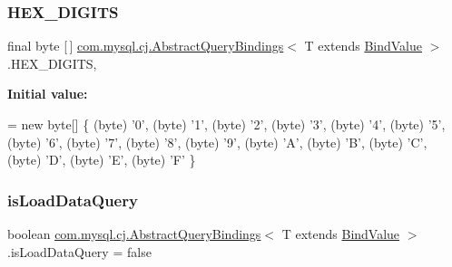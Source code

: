\subsubsection{\texorpdfstring{H\+E\+X\+\_\+\+D\+I\+G\+I\+TS}{HEX\_DIGITS}}
{\footnotesize\ttfamily final byte \mbox{[}$\,$\mbox{]} \mbox{\hyperlink{classcom_1_1mysql_1_1cj_1_1_abstract_query_bindings}{com.\+mysql.\+cj.\+Abstract\+Query\+Bindings}}$<$ T extends \mbox{\hyperlink{interfacecom_1_1mysql_1_1cj_1_1_bind_value}{Bind\+Value}} $>$.H\+E\+X\+\_\+\+D\+I\+G\+I\+TS\hspace{0.3cm}{\ttfamily [static]}, {\ttfamily [protected]}}

{\bfseries Initial value\+:}
\begin{DoxyCode}
= \textcolor{keyword}{new} byte[] \{ (byte) \textcolor{charliteral}{'0'}, (byte) \textcolor{charliteral}{'1'}, (byte) \textcolor{charliteral}{'2'}, (byte) \textcolor{charliteral}{'3'}, (byte) \textcolor{charliteral}{'4'}, (byte) \textcolor{charliteral}{'5'}, (byte) \textcolor{charliteral}{'6'}, (byte) \textcolor{charliteral}{
      '7'},
            (byte) \textcolor{charliteral}{'8'}, (byte) \textcolor{charliteral}{'9'}, (byte) \textcolor{charliteral}{'A'}, (byte) \textcolor{charliteral}{'B'}, (byte) \textcolor{charliteral}{'C'}, (byte) \textcolor{charliteral}{'D'}, (byte) \textcolor{charliteral}{'E'}, (byte) \textcolor{charliteral}{'F'} 
      \}
\end{DoxyCode}
\mbox{\label{classcom_1_1mysql_1_1cj_1_1_abstract_query_bindings_ae057e7a1b56daa198a730198f3040523}} 
\subsubsection{\texorpdfstring{is\+Load\+Data\+Query}{isLoadDataQuery}}
{\footnotesize\ttfamily boolean \mbox{\hyperlink{classcom_1_1mysql_1_1cj_1_1_abstract_query_bindings}{com.\+mysql.\+cj.\+Abstract\+Query\+Bindings}}$<$ T extends \mbox{\hyperlink{interfacecom_1_1mysql_1_1cj_1_1_bind_value}{Bind\+Value}} $>$.is\+Load\+Data\+Query = false\hspace{0.3cm}{\ttfamily [protected]}}

